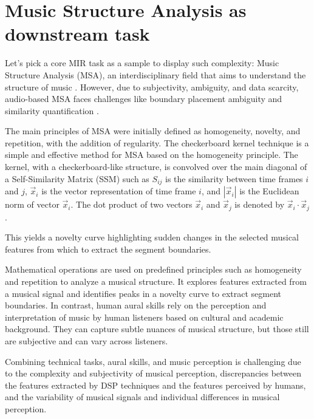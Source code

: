 \section{Music Structure Analysis as downstream task}

Let's pick a core MIR task as a sample to display such complexity: Music Structure Analysis (MSA), an interdisciplinary field that aims to understand the structure of music \cite{Nieto2020Audio-BasedApplications}. However, due to subjectivity, ambiguity, and data scarcity, audio-based MSA faces challenges like boundary placement ambiguity and similarity quantification \cite{NietoPerceptualMusic}. 

The main principles of MSA were initially defined as homogeneity, novelty, and repetition, with the addition of regularity. The checkerboard kernel technique is a simple and effective method for MSA based on the homogeneity principle. The kernel, with a checkerboard-like structure, is convolved over the main diagonal of a Self-Similarity Matrix (SSM) such as $S_{ij}$ is the similarity between time frames $i$ and $j$, $\vec{x}_i$ is the vector representation of time frame $i$, and $\left| \vec{x}_i \right|$ is the Euclidean norm of vector $\vec{x}_i$. The dot product of two vectors $\vec{x}_i$ and $\vec{x}_j$ is denoted by $\vec{x}_i \cdot \vec{x}_j$.



This yields a novelty curve highlighting sudden changes in the selected musical features from which to extract the segment boundaries.



Mathematical operations are used on predefined principles such as homogeneity and repetition to analyze a musical structure. It explores features extracted from a musical signal and identifies peaks in a novelty curve to extract segment boundaries. In contrast, human aural skills rely on the perception and interpretation of music by human listeners based on cultural and academic background. They can capture subtle nuances of musical structure, but those still are subjective and can vary across listeners.

Combining technical tasks, aural skills, and music perception is challenging due to the complexity and subjectivity of musical perception, discrepancies between the features extracted by DSP techniques and the features perceived by humans, and the variability of musical signals and individual differences in musical perception. 

